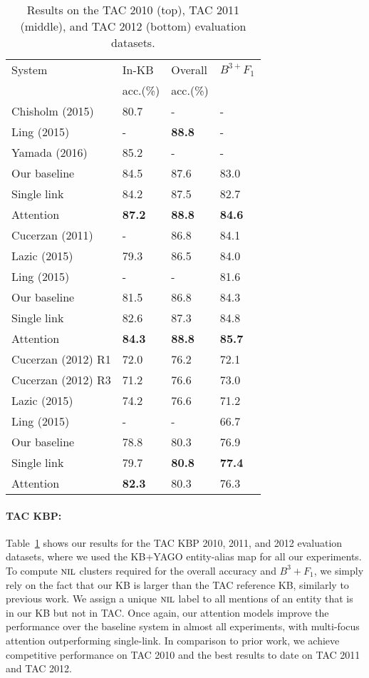 \begin{table}[t!]
\centering
\begin{tabular}{l|l|l|l}
 System & In-KB & Overall & {\small ${B^{3+}F_1}$} \\ 
 & acc.(\%) & acc.(\%) & \\
\hline
Chisholm (2015) & 80.7& - & - \\
Ling (2015) & - & {\bf 88.8} & - \\
Yamada (2016)&  85.2 & - & - \\
  Our baseline & 84.5 & 87.6 & 83.0 \\
 Single link & 84.2 & 87.5 & 82.7\\
 Attention & {\bf 87.2} & {\bf 88.8} & {\bf 84.6} \\
\hline \hline
Cucerzan (2011) & - & 86.8 &  84.1 \\
Lazic (2015) & 79.3 & 86.5 & 84.0 \\
Ling (2015) &- & - & 81.6 \\
Our baseline & 81.5 & 86.8 & 84.3 \\
Single link & 82.6 & 87.3 & 84.8 \\
 Attention & {\bf 84.3} & {\bf 88.8} & {\bf 85.7} \\
\hline
\hline
Cucerzan (2012) R1 & 72.0 & 76.2 & 72.1  \\
Cucerzan (2012) R3 & 71.2 & 76.6 & 73.0 \\
Lazic (2015) & {74.2} & {76.6} & 71.2 \\
Ling (2015) & - & - & 66.7 \\
Our baseline &78.8 & 80.3 & 76.9\\
 Single link & 79.7 & {\bf 80.8} & {\bf 77.4}  \\
 Attention &{\bf 82.3} & 80.3 & 76.3 \\
\end{tabular}
\caption{Results on the TAC 2010 (top), TAC 2011 (middle), and TAC 2012 (bottom) evaluation datasets. \label{table:tac_results} }
\end{table}

\paragraph*{TAC KBP:}
Table~\ref{table:tac_results} shows our results for the TAC KBP 2010, 2011, and 2012
evaluation datasets, where we used the KB+YAGO entity-alias map for all our experiments. 
To compute $\mbox{\textsc{nil}}$ clusters required for the overall accuracy
and $B^3+F_1$, we simply rely on the fact that our KB is larger than the TAC
reference KB, similarly to previous work. We assign a unique $\mbox{\textsc{nil}}$ label to
all mentions of an entity that is in our KB but not in TAC. 
Once again, our attention models improve the performance over the baseline
system in almost all experiments, with multi-focus attention outperforming single-link. In comparison to
prior work, we achieve competitive performance on TAC 2010 and the best
results to date on TAC 2011 and TAC 2012.

